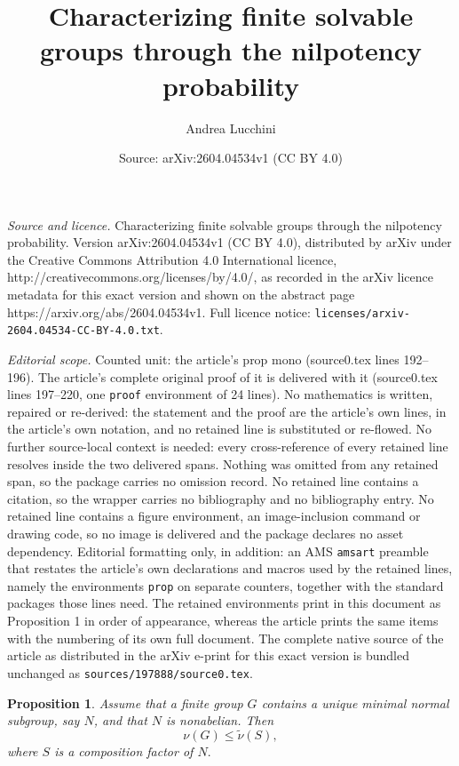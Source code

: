 \documentclass[10pt,a4paper]{amsart}
\title{Characterizing finite solvable groups through the nilpotency probability}
\author{Andrea Lucchini}
\date{Source: arXiv:2604.04534v1 (CC BY 4.0)}
\newtheorem{prop}{Proposition}
\begin{document}
\maketitle

\noindent\emph{Source and licence.} Characterizing finite solvable groups through the nilpotency probability. Version arXiv:2604.04534v1 (CC BY 4.0), distributed by arXiv under the Creative Commons Attribution 4.0 International licence, http://creativecommons.org/licenses/by/4.0/, as recorded in the arXiv licence metadata for this exact version and shown on the abstract page https://arxiv.org/abs/2604.04534v1. Full licence notice: \texttt{licenses/arxiv-2604.04534-CC-BY-4.0.txt}.\par\smallskip

\noindent\textit{Editorial scope.} Counted unit: the article's prop mono (source0.tex lines 192--196). The article's complete original proof of it is delivered with it (source0.tex lines 197--220, one \texttt{proof} environment of 24 lines). No mathematics is written, repaired or re-derived: the statement and the proof are the article's own lines, in the article's own notation, and no retained line is substituted or re-flowed.  No further source-local context is needed: every cross-reference of every retained line resolves inside the two delivered spans.  Nothing was omitted from any retained span, so the package carries no omission record.  No retained line contains a citation, so the wrapper carries no bibliography and no bibliography entry.  No retained line contains a figure environment, an image-inclusion command or drawing code, so no image is delivered and the package declares no asset dependency.  Editorial formatting only, in addition: an AMS \texttt{amsart} preamble that restates the article's own declarations and macros used by the retained lines, namely the environments \texttt{prop} on separate counters, together with the standard packages those lines need.  The retained environments print in this document as Proposition 1 in order of appearance, whereas the article prints the same items with the numbering of its own full document.  The complete native source of the article as distributed in the arXiv e-print for this exact version is bundled unchanged as \texttt{sources/197888/source0.tex}.
\begin{prop}\label{mono}
	Assume that a finite group $G$ contains a unique minimal normal subgroup, say $N$, and that $N$ is nonabelian. Then
	$$\nu(G)\leq \tilde\nu(S),$$
	where $S$ is a composition factor of $N.$
\end{prop}
\end{document}
